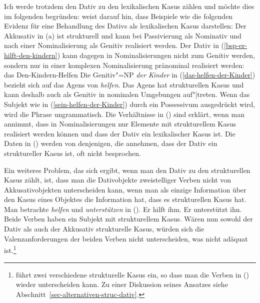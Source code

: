 Ich werde trotzdem den Dativ zu den lexikalischen Kasus zählen und möchte dies im folgenden
begründen: \citet[]{Haider86} weist darauf hin, dass Beispiele wie die folgenden Evidenz
für eine Behandlung des Dativs als lexikalischen Kasus darstellen:
\eal
{}
\label{das-helfen-der-Kinder}
\label{sein-helfen-der-Kinder}
\zl
Der Akkusativ in (a) ist strukturell und kann bei Passivierung als Nominativ
und nach einer Nominalisierung als Genitiv realisiert werden.
Der Dativ in (\ref{bsp-er-hilft-den-kindern}) kann dagegen in Nominalisierungen nicht zum Genitiv werden,
sondern nur in einer komplexen Nominalisierung pränominal realisiert werden:
\ea
das Den-Kindern-Helfen
\z
Die Genitiv"=NP \emph{der Kinder} in (\ref{das-helfen-der-Kinder}) bezieht sich auf das Agens
von \emph{helfen}. Das Agens hat strukturellen Kasus und kann deshalb auch als Genitiv in
nominalen Umgebungen auf"|treten. Wenn das Subjekt wie in (\ref{sein-helfen-der-Kinder})
durch ein Possessivum ausgedrückt wird, wird die Phrase ungrammatisch. Die Verhältnisse in
() sind erklärt, wenn man annimmt, dass in Nominalisierungen nur Elemente mit strukturellem
Kasus realisiert werden können und dass der Dativ ein lexikalischer Kasus ist.
Die Daten in ()
werden von denjenigen, die annehmen, dass der Dativ ein struktureller Kasus ist, oft
nicht besprochen.

Ein weiteres Problem, das sich ergibt, wenn man den Dativ zu den strukturellen Kasus
zählt, ist, dass man die Dativobjekte zweistelliger Verben
nicht von Akkusativobjekten
unterscheiden kann, wenn man als einzige Information über den Kasus eines Objektes
die Information hat, dass es strukturellen Kasus hat. Man betrachte \zb \emph{helfen} und
\emph{unterstützen} in ().
\eal
\ex Er hilft ihm.
\ex Er unterstützt ihn.
\zl
Beide Verben haben ein Subjekt mit strukturellem Kasus. Wären nun sowohl der Dativ als auch der
Akkusativ strukturelle Kasus, würden sich die Valenzanforderungen der beiden Verben nicht
unterscheiden, was nicht adäquat ist.\footnote{
  \citet{Gunkel2003b} führt zwei verschiedene strukturelle Kasus ein, so dass man die Verben in
  () wieder unterscheiden kann. Zu einer Diskussion seines Ansatzes siehe
  Abschnitt~\ref{sec-alternativen-struc-dativ}.%
}

